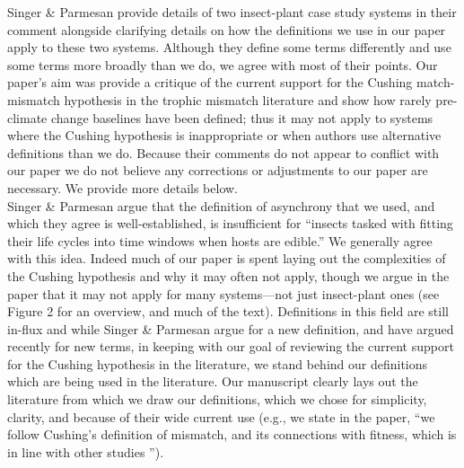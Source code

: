 \documentclass[11pt,letter]{article}
\begin{document}

\renewcommand{\refname}{\CHead{}}

Singer \& Parmesan provide details of two insect-plant case study systems in their comment alongside clarifying details on how the definitions we use in our paper apply to these two systems. Although they define some terms differently and use some terms more broadly than we do, we agree with most of their points. Our paper's aim was provide a critique of the current support for the Cushing match-mismatch hypothesis in the trophic mismatch literature and show how rarely pre-climate change baselines have been defined; thus it may not apply to systems where the Cushing hypothesis is inappropriate or when authors use alternative definitions than we do. Because their comments do not appear to conflict with our paper we do not believe any corrections or adjustments to our paper are necessary.  We provide more details below.\\

Singer \& Parmesan argue that the definition of asynchrony that we used, and which they agree is well-established, is insufficient for ``insects tasked with fitting their life cycles into time windows when hosts are edible.''  We generally agree with this idea. Indeed much of our paper is spent laying out the complexities of the Cushing hypothesis and why it may often not apply, though we argue in the paper that it may not apply for many systems---not just insect-plant ones (see Figure 2 for an overview, and much of the text). Definitions in this field are still in-flux and while Singer \& Parmesan argue for a new definition, and \citet{vissergienapp2019} have argued recently for new terms, in keeping with our goal of reviewing the current support for the Cushing hypothesis in the literature, we stand behind our definitions which are being used in the literature. Our manuscript clearly lays out the literature from which we draw our definitions, which we chose for simplicity, clarity, and because of their wide current use (e.g., we state in the paper, ``we follow Cushing's definition of mismatch, and its connections with fitness, which is in line with other studies \citep{Johansson2015,durant2007,kerby2012}''). \\
\end{document}
